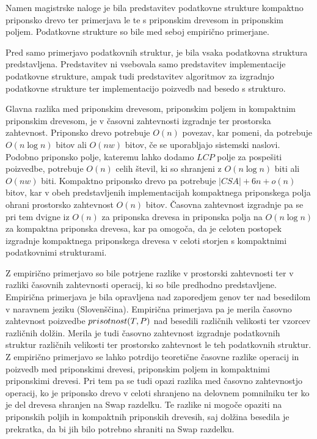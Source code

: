Namen magistrske naloge je bila predstavitev podatkovne strukture kompaktno priponsko drevo ter primerjava le te s priponskim drevesom in priponskim poljem. Podatkovne strukture so bile med seboj empirično primerjane.

Pred samo primerjavo podatkovnih struktur, je bila vsaka podatkovna struktura predstavljena. Predstavitev ni vsebovala samo predstavitev implementacije podatkovne strukture, ampak tudi predstavitev algoritmov za izgradnjo podatkovne strukture ter implementacijo poizvedb nad besedo s strukturo.

Glavna razlika med priponskim drevesom, priponskim poljem in kompaktnim priponskim drevesom, je v časovni zahtevnosti izgradnje ter prostorska zahtevnost. Priponsko drevo potrebuje $O(n)$ povezav, kar pomeni, da potrebuje $O(n\log{n})$ bitov ali $O(nw)$ bitov, če se uporabljajo sistemski naslovi. Podobno priponsko polje, kateremu lahko dodamo $LCP$ polje za pospešiti poizvedbe, potrebuje $O(n)$ celih števil, ki so shranjeni z $O(n\log{n})$ biti ali $O(nw)$ biti. Kompaktno priponsko drevo pa potrebuje $|CSA|+6n+o(n)$ bitov, kar v obeh predstavljenih implementacijah kompaktnega priponskega polja ohrani prostorsko zahtevnost $O(n)$ bitov. Časovna zahtevnost izgradnje pa se pri tem dvigne iz $O(n)$ za priponska drevesa in priponska polja na $O(n\log{n})$ za kompaktna priponska drevesa, kar pa omogoča, da je celoten postopek izgradnje kompaktnega priponskega drevesa v celoti storjen s kompaktnimi podatkovnimi strukturami.

Z empirično primerjavo so bile potrjene razlike v prostorski zahtevnosti ter v razliki časovnih zahtevnosti operacij, ki so bile predhodno predstavljene. Empirična primerjava je bila opravljena nad zaporedjem genov ter nad besedilom v naravnem jeziku (Slovenščina). Empirična primerjava pa je merila časovno zahtevnost poizvedbe $ \mathop{prisotnost}(T,P) $ nad besedili različnih velikosti ter vzorcev različnih dolžin. Merila je tudi časovno zahtevnost izgradnje podatkovnih struktur različnih velikosti ter prostorsko zahtevnost le teh podatkovnih struktur. Z empirično primerjavo se lahko potrdijo teoretične časovne razlike operacij in poizvedb med priponskimi drevesi, priponskim poljem in kompaktnimi priponskimi drevesi. Pri tem pa se tudi opazi razlika med časovno zahtevnostjo operacij, ko je priponsko drevo v celoti shranjeno na delovnem pomnilniku ter ko je del drevesa shranjen na Swap razdelku. Te razlike ni mogoče opaziti na priponskih poljih in kompaktnih priponskih drevesih, saj dolžina besedila je prekratka, da bi jih bilo potrebno shraniti na Swap razdelku.


